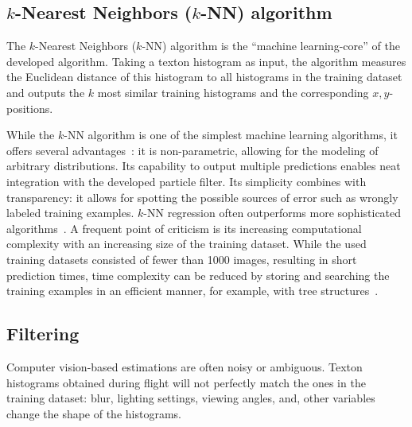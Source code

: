 \documentclass[11pt]{report}
\begin{document}
\subsection{$k$-Nearest Neighbors ($k$-NN) algorithm}
\label{sec:knn}

The $k$-Nearest Neighbors ($k$-NN) algorithm is the ``machine
learning-core'' of the developed algorithm. Taking a texton histogram
as input, the algorithm measures the Euclidean distance of this
histogram to all histograms in the training dataset and outputs the
$k$ most similar training histograms and the corresponding
$x,y$-positions.

While the $k$-NN algorithm is one of the simplest machine learning
algorithms, it offers several advantages~\cite{kordos2010we}: it is
non-parametric, allowing for the modeling of arbitrary
distributions. Its capability to output multiple predictions enables
neat integration with the developed particle filter. Its simplicity
combines with transparency: it allows for spotting the possible
sources of error such as wrongly labeled training examples. $k$-NN
regression often outperforms more sophisticated
algorithms~\cite{knn}. A frequent point of criticism is its increasing
computational complexity with an increasing size of the training
dataset. While the used training datasets consisted of fewer than 1000
images, resulting in short prediction times, time complexity can be
reduced by storing and searching the training examples in an efficient
manner, for example, with tree structures~\cite{bhatia2010survey}.



\subsection{Filtering}
\label{sec:filtering}

Computer vision-based estimations are often noisy or ambiguous. Texton
histograms obtained during flight will not perfectly match the ones in
the training dataset: blur, lighting settings, viewing angles, and,
other variables change the shape of the histograms.
\end{document}

